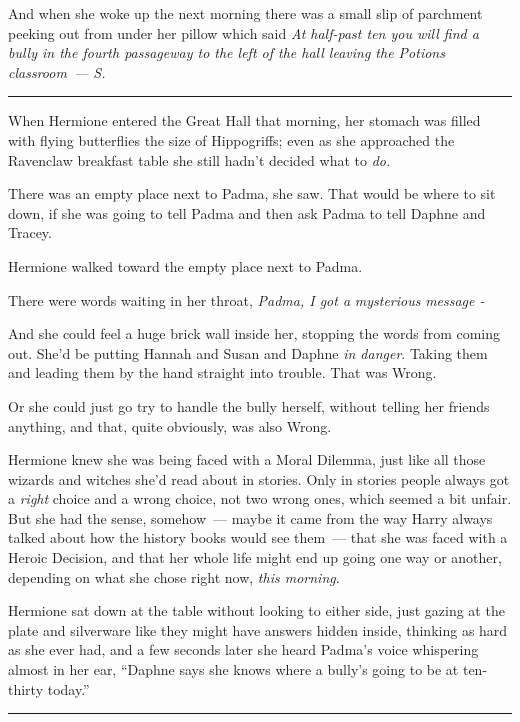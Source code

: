 And when she woke up the next morning there was a small slip of parchment peeking out from under her pillow which said \emph{At half-past ten you will find a bully in the fourth passageway to the left of the hall leaving the Potions classroom~--- S.}

\begin{center}\rule{3in}{0.4pt}\end{center}

When Hermione entered the Great Hall that morning, her stomach was filled with flying butterflies the size of Hippogriffs; even as she approached the Ravenclaw breakfast table she still hadn't decided what to \emph{do.}

There was an empty place next to Padma, she saw. That would be where to sit down, if she was going to tell Padma and then ask Padma to tell Daphne and Tracey.

Hermione walked toward the empty place next to Padma.

There were words waiting in her throat, \emph{Padma, I got a} \emph{mysterious} \emph{message -}

And she could feel a huge brick wall inside her, stopping the words from coming out. She'd be putting Hannah and Susan and Daphne \emph{in danger}. Taking them and leading them by the hand straight into trouble. That was Wrong.

Or she could just go try to handle the bully herself, without telling her friends anything, and that, quite obviously, was also Wrong.

Hermione knew she was being faced with a Moral Dilemma, just like all those wizards and witches she'd read about in stories. Only in stories people always got a \emph{right} choice and a wrong choice, not two wrong ones, which seemed a bit unfair. But she had the sense, somehow~--- maybe it came from the way Harry always talked about how the history books would see them~--- that she was faced with a Heroic Decision, and that her whole life might end up going one way or another, depending on what she chose right now, \emph{this morning}.

Hermione sat down at the table without looking to either side, just gazing at the plate and silverware like they might have answers hidden inside, thinking as hard as she ever had, and a few seconds later she heard Padma's voice whispering almost in her ear, ``Daphne says she knows where a bully's going to be at ten-thirty today.''

\begin{center}\rule{3in}{0.4pt}\end{center}

